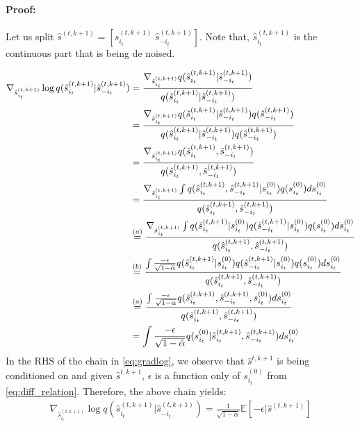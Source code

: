 \paragraph{Proof:}

Let us split $\hat{s}^{(t, k+1)} = \left[\hat{s}_{i_t}^{(t, k+1)} \; \hat{s}_{-i_t}^{(t, k+1)}  \right]$. Note that, $\hat{s}_{i_t}^{(t, k+1)}$ is the continuous part that is being de noised.

\begin{align} \label{eq:gradlog}
    \nabla_{\hat{s}_{i_t}^{(t, k+1)}} \log q(\hat{s}_{i_t}^{(t, k+1)} | \hat{s}_{-i_t}^{(t, k+1)} )  
  \hfill & =\frac{\nabla_{\hat{s}_{i_t}^{(t, k+1)}}  q(\hat{s}_{i_t}^{(t, k+1)} | \hat{s}_{-i_t}^{(t, k+1)} )}{ q(\hat{s}_{i_t}^{(t, k+1)} | \hat{s}_{-i_t}^{(t, k+1)} )} \nonumber \\
   \hfill & = \frac{\nabla_{\hat{s}_{i_t}^{(t, k+1)}}  q(\hat{s}_{i_t}^{(t, k+1)} | \hat{s}_{-i_t}^{(t, k+1)} ) q(\hat{s}_{-i_t}^{(t, k+1)})}{ q(\hat{s}_{i_t}^{(t, k+1)} | \hat{s}_{-i_t}^{(t, k+1)} ) q(\hat{s}_{-i_t}^{(t, k+1)})} \nonumber \\
   \hfill & = \frac{\nabla_{\hat{s}_{i_t}^{(t, k+1)}}  q(\hat{s}_{i_t}^{(t, k+1)}, \hat{s}_{-i_t}^{(t, k+1)} )}{ q(\hat{s}_{i_t}^{(t, k+1)} , \hat{s}_{-i_t}^{(t, k+1)} )} 
    \nonumber \\
    \hfill & = \frac{\nabla_{\hat{s}_{i_t}^{(t, k+1)}}  \int q(\hat{s}_{i_t}^{(t, k+1)}, \hat{s}_{-i_t}^{(t, k+1)} | s_{i_t}^{(0)} ) q(s_{i_t}^{(0)}) ds_{i_t}^{(0)} } { q(\hat{s}_{i_t}^{(t, k+1)} , \hat{s}_{-i_t}^{(t, k+1)} )} \nonumber \\
    \hfill & \overset{(a)}{=} \frac{\nabla_{\hat{s}_{i_t}^{(t, k+1)}}  \int q(\hat{s}_{i_t}^{(t, k+1)}| s_{i_t}^{(0)} ) q( \hat{s}_{-i_t}^{(t, k+1)} |  s_{i_t}^{(0)}) q(s_{i_t}^{(0)}) ds_{i_t}^{(0)} } { q(\hat{s}_{i_t}^{(t, k+1)} , \hat{s}_{-i_t}^{(t, k+1)} )} \nonumber \\
    \hfill &\overset{(b)}{=} \frac{\int \frac{-\epsilon}{\sqrt{1-\bar{\alpha}}} q(\hat{s}_{i_t}^{(t, k+1)}| s_{i_t}^{(0)} ) q( \hat{s}_{-i_t}^{(t, k+1)} |  s_{i_t}^{(0)}) q(s_{i_t}^{(0)}) ds_{i_t}^{(0)} } { q(\hat{s}_{i_t}^{(t, k+1)} , \hat{s}_{-i_t}^{(t, k+1)} )}  \nonumber \\
    \hfill &\overset{(a)}{=} \frac{\int \frac{-\epsilon}{\sqrt{1-\bar{\alpha}}} q(\hat{s}_{i_t}^{(t, k+1)}, \hat{s}_{-i_t}^{(t, k+1)},s_{i_t}^{(0)})  ds_{i_t}^{(0)} } { q(\hat{s}_{i_t}^{(t, k+1)} , \hat{s}_{-i_t}^{(t, k+1)} )} \nonumber \\
    \hfill & = \int \frac{-\epsilon}{\sqrt{1-\bar{\alpha}}} q(s_{i_t}^{(0)} |\hat{s}_{i_t}^{(t, k+1)}, \hat{s}_{-i_t}^{(t, k+1)})  ds_{i_t}^{(0)}  
\end{align}
In the RHS of the chain in \eqref{eq:gradlog}, we observe that $\hat{s}^{t,k+1}$ is being conditioned on and given $\hat{s}^{t,k+1}$, $\epsilon$ is a function only of $s_{i_t}^{(0)}$ from \eqref{eq:diff_relation}. Therefore, the above chain yields:
 \begin{align}
     \nabla_{\hat{s}_{i_t}^{(t, k+1)}} \log q(\hat{s}_{i_t}^{(t, k+1)} | \hat{s}_{-i_t}^{(t, k+1)} )  = \frac{1}{\sqrt{1-\bar{\alpha}}} \mathbb{E} \left[ -\epsilon | \hat{s}^{(t,k+1)} \right]
 \end{align}
 
